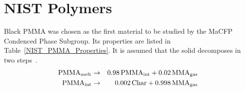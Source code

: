 \clearpage

\section{NIST Polymers}
\label{NIST_Polymers_Properties}

Black PMMA was chosen as the first material to be studied by the MaCFP Condenced Phase Subgroup. Its properties are listed in Table~\ref{NIST_PMMA_Properties}. It is assumed that the solid decomposes in two steps~\cite{Fiola:FSJ2021}.
\begin{eqnarray}
   \hbox{PMMA}_{\rm melt}   &\to& 0.98 \, \hbox{PMMA}_{\rm int} + 0.02 \, \hbox{MMA}_{\rm gas}  \label{PMMA1of2} \\
   \hbox{PMMA}_{\rm int}    &\to& 0.002 \, \hbox{Char} +         0.998 \, \hbox{MMA}_{\rm gas}   \label{PMMA2of2}
\end{eqnarray}

